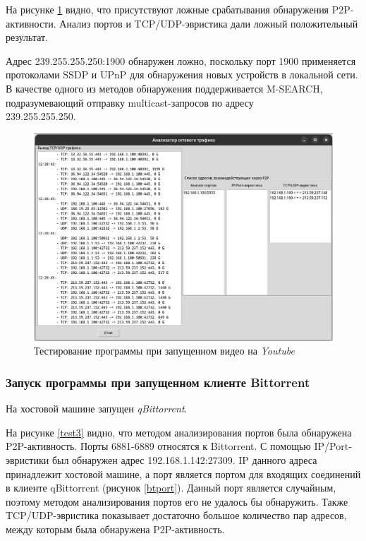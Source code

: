 \documentclass[bachelor, och, coursework]{SCWorks}
\begin{document}
На рисунке \ref{test2} видно, что присутствуют ложные срабатывания обнаружения P2P-активности. Анализ портов и TCP/UDP-эвристика дали ложный положительный результат.

Адрес 239.255.255.250:1900 обнаружен ложно, поскольку порт 1900 применяется протоколами SSDP и UPnP для обнаружения новых устройств в локальной сети. В качестве одного из методов обнаружения поддерживается M-SEARCH, подразумевающий отправку multicast-запросов по адресу \\ 239.255.255.250. \cite{IANA}

\begin{figure}[H]
    \centering
    \includegraphics[width=0.999\textwidth]{test2.png}
    \caption{Тестирование программы при запущенном видео на \textit{Youtube}}
    \label{test2}
\end{figure}

\subsubsection{Запуск программы при запущенном клиенте Bittorrent}
На хостовой машине запущен \textit{qBittorrent}. 

На рисунке \ref{test3} видно, что методом анализирования портов была обнаружена P2P-активность. Порты 6881-6889 относятся к Bittorrent. С помощью IP/Port-эвристики был обнаружен адрес 192.168.1.142:27309. IP данного адреса принадлежит хостовой машине, а порт является портом для входящих соединений в клиенте qBittorrent (рисунок \ref{btport}). Данный порт является случайным, поэтому методом анализирования портов его не удалось бы обнаружить. Также TCP/UDP-эвристика показывает достаточно большое количество пар адресов, между которым была обнаружена P2P-активность.
\end{document}
